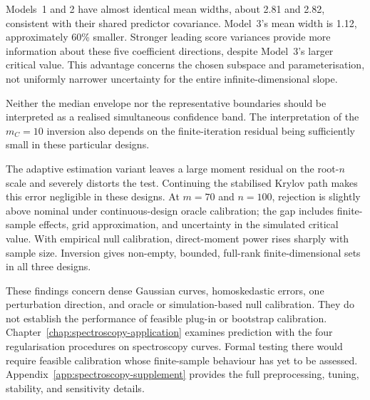 Models~1 and 2 have almost identical mean widths, about 2.81 and 2.82,
consistent with their shared predictor covariance.  Model~3's mean width
is 1.12, approximately 60\% smaller.  Stronger leading score variances
provide more information about these five coefficient directions, despite
Model~3's larger critical value.  This advantage concerns the chosen
subspace and parameterisation, not uniformly narrower uncertainty for the
entire infinite-dimensional slope.

Neither the median envelope nor
the representative boundaries should be interpreted as a realised
simultaneous confidence band.  The interpretation of the $m_C=10$ inversion
also depends on the finite-iteration residual being sufficiently small in
these particular designs.

The adaptive estimation variant leaves a large moment residual on the root-$n$
scale and severely distorts the test.  Continuing the stabilised Krylov path
makes this error negligible in these designs.  At $m=70$ and $n=100$,
rejection is slightly above nominal under continuous-design oracle
calibration; the gap includes finite-sample effects, grid approximation, and
uncertainty in the simulated critical value.  With empirical null calibration, direct-moment power rises sharply
with sample size.  Inversion gives non-empty, bounded, full-rank
finite-dimensional sets in all three designs.

These findings concern dense Gaussian curves, homoskedastic errors, one
perturbation direction, and oracle or simulation-based null calibration.
They do not establish the performance of feasible plug-in or bootstrap
calibration.  Chapter~\ref{chap:spectroscopy-application} examines prediction
with the four regularisation procedures on spectroscopy curves.  Formal
testing there would require feasible calibration whose finite-sample
behaviour has yet to be assessed.  Appendix~\ref{app:spectroscopy-supplement}
provides the full preprocessing, tuning, stability, and sensitivity details.
